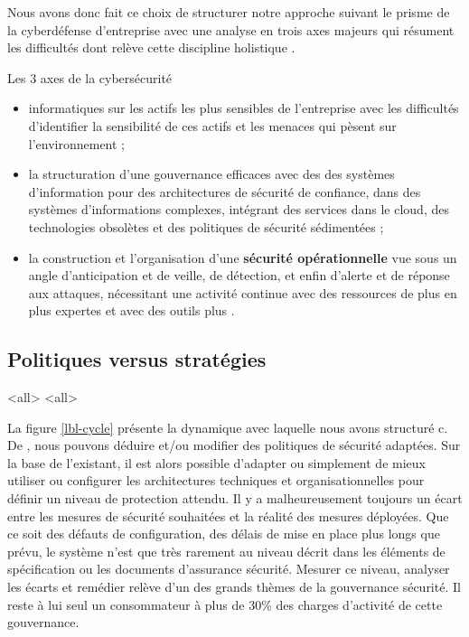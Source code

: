 Nous avons donc fait ce choix de structurer notre approche suivant le prisme de la cyberdéfense d'entreprise avec une analyse en trois axes majeurs qui résument les difficultés dont relève cette discipline holistique \cite{sch13}. 


\begin{frame}{Les 3 axes de la cybersécurité}
	\begin{itemize}
 \item {} informatiques sur les actifs les plus sensibles de l'entreprise avec les difficultés d'identifier la sensibilité de ces actifs et les menaces qui pèsent sur l'environnement ;
\item la structuration d'une gouvernance efficaces avec des  des systèmes d'information pour des architectures de sécurité de confiance, dans des systèmes d'informations complexes, intégrant des services dans le cloud, des technologies obsolètes et des politiques de sécurité sédimentées ;
\item la construction et l’organisation d'une \textbf{sécurité opérationnelle} vue sous un angle d'anticipation et de veille, de détection, et enfin d'alerte et de réponse aux attaques, nécessitant une activité continue avec des ressources de plus en plus expertes et avec des outils plus .
\end{itemize}
\end{frame}

\subsection {Politiques versus stratégies}

\mode<all>{
\mode<all>{}
}

La figure \ref{lbl-cycle} présente la dynamique avec laquelle nous avons structuré c\edoc. De  , nous pouvons déduire et/ou modifier des politiques de sécurité adaptées. 
Sur la base de l’existant, il est alors possible d’adapter ou simplement de mieux utiliser ou configurer les architectures techniques et organisationnelles pour définir un niveau de protection attendu.
Il y a malheureusement toujours un écart entre les mesures de sécurité souhaitées et la réalité des mesures déployées. Que ce soit des défauts de configuration, des délais de mise en place plus longs que prévu, le système n’est que très rarement au niveau décrit dans les éléments de spécification ou les documents d'assurance sécurité.
Mesurer ce niveau, analyser les écarts et remédier relève d’un des grands thèmes de la gouvernance sécurité. Il reste à lui seul un consommateur à plus de 30\% des charges d'activité de cette gouvernance.

